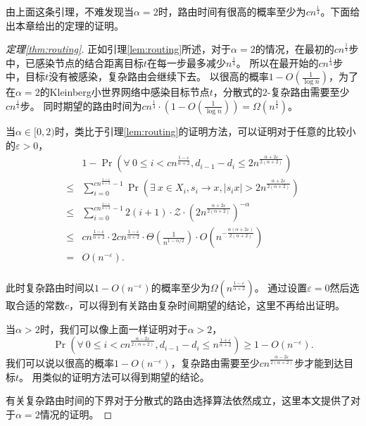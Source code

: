 由上面这条引理，不难发现当$\alpha = 2$时，路由时间有很高的概率至少为$cn^{\frac{1}{4}}$。下面给出本章给出的定理的证明。
\begin{proof}[定理\ref{thm:routing}]
正如引理\ref{lem:routing}所述，对于$\alpha = 2$的情况，在最初的$cn^{\frac{1}{4}}$步中，已感染节点的结合距离目标$t$在每一步最多减少$n^{\frac{1}{4}}$。
所以在最开始的$cn^{\frac{1}{4}}$步中，目标$t$没有被感染，复杂路由会继续下去。
以很高的概率$1-O(\frac{1}{\log n})$，为了在$\alpha=2$的Kleinberg小世界网络中感染目标节点$t$，分散式的$2$-复杂路由需要至少$cn^{\frac{1}{4}}$步。
同时期望的路由时间为$cn^{\frac{1}{4}} \cdot (1-O(\frac{1}{\log n})) = \Omega(n^{\frac{1}{4}})$。

当$\alpha\in [0,2)$时，类比于引理\ref{lem:routing}的证明方法，可以证明对于任意的比较小的$\varepsilon > 0$，
\begin{equation*}
\begin{array}{ll}
& 1- \Pr(\forall~0 \leq i < cn^{\frac{1-\varepsilon}{\alpha+2}},
d_{i-1}-d_{i}\leq 2n^{\frac{\alpha + 2\varepsilon}{2(\alpha+2)}})\\
\leq & \sum_{i=0}^{cn^{\frac{1-\varepsilon}{\alpha+2}}-1}\Pr(\exists~x \in X_i, s_i \to x,
|s_ix| > 2n^{\frac{\alpha + 2\varepsilon}{2(\alpha+2)}})\\
\leq & \sum_{i=0}^{cn^{\frac{1-\varepsilon}{\alpha+2}}-1} 2(i+1) \cdot \mathcal{Z} \cdot (2n^{\frac{\alpha + 2\varepsilon}{2(\alpha+2)}})^{-\alpha} \\
\leq & cn^{\frac{1-\varepsilon}{\alpha+2}}
\cdot 2cn^{\frac{1-\varepsilon}{\alpha+2}} \cdot \Theta(\frac{1}{n^{1-\alpha/2}})\cdot
O(n^{-\frac{\alpha(\alpha + 2\varepsilon)}{2(\alpha+2)}})\\
= & O(n^{-\varepsilon}).\\
\end{array}
\end{equation*}

此时复杂路由时间以$1-O(n^{-\varepsilon})$的概率至少为$\Omega(n^{\frac{1-\varepsilon}{\alpha+2}})$。
通过设置$\varepsilon = 0$然后选取合适的常数$c$，可以得到有关路由复杂时间期望的结论，这里不再给出证明。

当$ \alpha >2$时，我们可以像上面一样证明对于$ \alpha >2$，
$$\Pr(\forall~0 \leq i < cn^{\frac{\alpha-2\varepsilon}{2(\alpha+2)}},
d_{i-1}-d_{i}\leq n^{\frac{1 + \varepsilon}{\alpha+2}}) \geq 1-O(n^{-\varepsilon}).$$
我们可以说以很高的概率$1-O(n^{-\varepsilon})$，复杂路由需要至少$cn^{\frac{\alpha-2\varepsilon}{2(\alpha+2)}}$步才能到达目标$t$。
用类似的证明方法可以得到期望的结论。

有关复杂路由时间的下界对于分散式的路由选择算法依然成立，这里本文提供了对于$\alpha = 2$情况的证明。


\end{proof}
